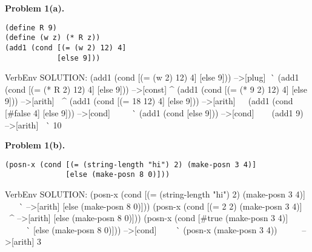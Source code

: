 \documentclass[12pt]{article}
\begin{document}
\noindent
{\bf Problem 1(a).}

\begin{verbatim}
(define R 9)
(define (w z) (* R z))
(add1 (cond [(= (w 2) 12) 4]
            [else 9]))
\end{verbatim}

\vskip 2.5in


\begin{SaveVerbatim}{VerbEnv}  
SOLUTION:
(add1 (cond [(= (w 2) 12) 4] [else 9]))   -->[plug]
                ^^^^^                                    
(add1 (cond [(= (* R 2) 12) 4] [else 9])) -->[const]
                   ^                          
(add1 (cond [(= (* 9 2) 12) 4] [else 9])) -->[arith]
                ^^^^^^^           
(add1 (cond [(= 18 12) 4] [else 9]))      -->[arith]
             ^^^^^^^^^            
(add1 (cond [#false 4] [else 9]))         -->[cond]
      ^^^^^^^^^^^^^^^^^^^^^^^^^^            
(add1 (cond [else 9]))                    -->[cond]
      ^^^^^^^^^^^^^^^             
(add1 9)                                  -->[arith]
^^^^^^^^                          
10
\end{SaveVerbatim}

\censor{\vspace{-2.5in}}




\noindent
{\bf Problem 1(b).}

\begin{verbatim}
(posn-x (cond [(= (string-length "hi") 2) (make-posn 3 4)]
              [else (make-posn 8 0)]))
\end{verbatim}


\begin{SaveVerbatim}{VerbEnv}
SOLUTION:
(posn-x (cond [(= (string-length "hi") 2) (make-posn 3 4)]
                  ^^^^^^^^^^^^^^^^^^^^                     -->[arith]
              [else (make-posn 8 0)]))
(posn-x (cond [(= 2 2) (make-posn 3 4)]
               ^^^^^^^                                     -->[arith]
              [else (make-posn 8 0)]))
(posn-x (cond [#true (make-posn 3 4)]
        ^^^^^^^^^^^^^^^^^^^^^^^^^^^^^       
              [else (make-posn 8 0)]))                     -->[cond]
              ^^^^^^^^^^^^^^^^^^^^^^^         
(posn-x (make-posn 3 4))              
^^^^^^^^^^^^^^^^^^^^^^^^                                   -->[arith]
3
\end{SaveVerbatim}

\end{document}
